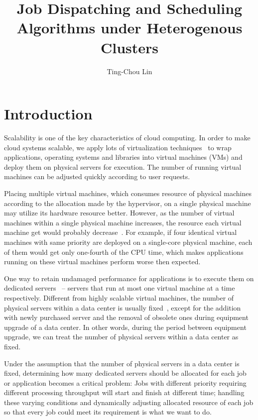 \documentclass[11pt]{article}
\title{\textbf{Job Dispatching and Scheduling Algorithms under Heterogenous Clusters}}
\author{Ting-Chou Lin\\}
\date{}
\begin{document}
\maketitle

\section{Introduction}

Scalability is one of the key characteristics of cloud computing.  In
order to make cloud systems scalable, we apply lots of virtualization
techniques~\cite{secure_virt_for_cloud, cloud_issue} to wrap
applications, operating systems and libraries into virtual machines
(VMs) and deploy them on physical servers for execution.  The number of
running virtual machines can be adjusted quickly according to user
requests.

Placing multiple virtual machines, which consumes resource of physical
machines according to the allocation made by the hypervisor, on a single
physical machine may utilize its hardware resource better.  However, as
the number of virtual machines within a single physical machine
increases, the resource each virtual machine get would probably
decrease~\cite{resource_overbooking}.  For example, if four identical
virtual machines with same priority are deployed on a single-core
physical machine, each of them would get only one-fourth of the CPU
time, which makes applications running on these virtual machines perform
worse then expected.

One way to retain undamaged performance for applications is to execute
them on dedicated servers~\cite{dedicated_hosting} -- servers that run
at most one virtual machine at a time respectively.  Different from
highly scalable virtual machines, the number of physical servers within
a data center is usually fixed~\cite{maintenance_framework}, except for
the addition with newly purchased server and the removal of obsolete
ones during equipment upgrade of a data center.  In other words, during
the period between equipment upgrade, we can treat the number of
physical servers within a data center as fixed.

Under the assumption that the number of physical servers in a data
center is fixed, determining how many dedicated servers should be
allocated for each job or application becomes a critical problem:  Jobs
with different priority requiring different processing throughput will
start and finish at different time; handling these varying conditions
and dynamically adjusting allocated resource of each job so that every
job could meet its requirement is what we want to do.
\end{document}
